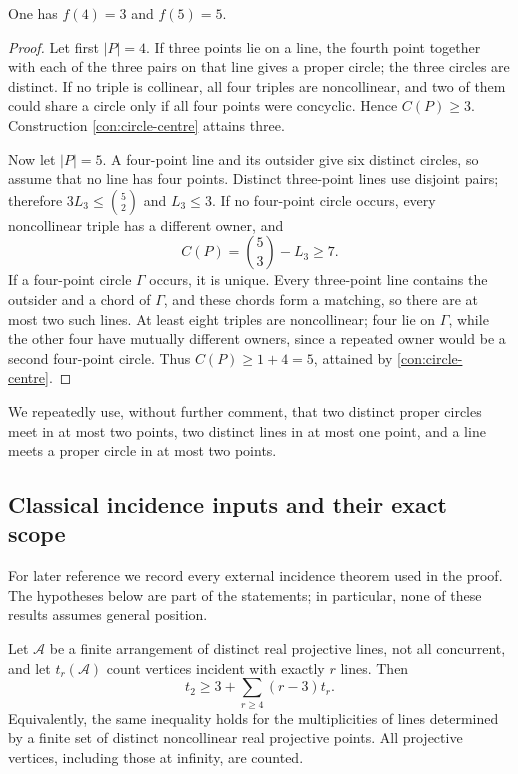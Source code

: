 \begin{proposition}\label{prop:n4-n5}
One has $f(4)=3$ and $f(5)=5$.
\end{proposition}

\begin{proof}
Let first $|P|=4$.  If three points lie on a line, the fourth point together
with each of the three pairs on that line gives a proper circle; the three
circles are distinct.  If no triple is collinear, all four triples are
noncollinear, and two of them could share a circle only if all four points
were concyclic.  Hence $C(P)\geq3$.  Construction
\ref{con:circle-centre} attains three.

Now let $|P|=5$.  A four-point line and its outsider give six distinct
circles, so assume that no line has four points.  Distinct three-point lines
use disjoint pairs; therefore $3L_3\leq\binom52$ and $L_3\leq3$.  If no
four-point circle occurs, every noncollinear triple has a different owner,
and
\[
 C(P)=\binom53-L_3\geq7.
\]
If a four-point circle $\Gamma$ occurs, it is unique.  Every three-point line
contains the outsider and a chord of $\Gamma$, and these chords form a
matching, so there are at most two such lines.  At least eight triples are
noncollinear; four lie on $\Gamma$, while the other four have mutually
different owners, since a repeated owner would be a second four-point
circle.  Thus $C(P)\geq1+4=5$, attained by
\cref{con:circle-centre}.
\end{proof}


We repeatedly use, without further comment, that two distinct proper circles
meet in at most two points, two distinct lines in at most one point, and a
line meets a proper circle in at most two points.

\subsection{Classical incidence inputs and their exact scope}
\label{subsec:classical-inputs}

For later reference we record every external incidence theorem used in the
proof.  The hypotheses below are part of the statements; in particular, none
of these results assumes general position.

\begin{theorem}[Melchior]\label{thm:melchior}
Let $\mathcal A$ be a finite arrangement of distinct real projective lines,
not all concurrent, and let $t_r(\mathcal A)$ count vertices incident with
exactly $r$ lines.  Then
\begin{equation}\label{eq:melchior}
 t_2\geq3+\sum_{r\geq4}(r-3)t_r.
\end{equation}
Equivalently, the same inequality holds for the multiplicities of lines
determined by a finite set of distinct noncollinear real projective points.
All projective vertices, including those at infinity, are counted.
\end{theorem}

